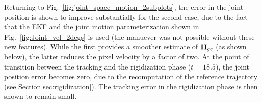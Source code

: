 
Returning to Fig.~\ref{fig:joint_space_motion_2subplots}, the error in the joint position is shown to improve substantially for the second case, due to the fact that the EKF and the joint motion parameterization shown in Fig.~\ref{fig:Joint_vel_2degs} is used (the manuever was not possible without these new features). While the first provides a smoother estimate of $\boldsymbol {\mathrm{H}}{}_{ge}$ (as shown below), the latter reduces the pixel velocity by a factor of two. At the point of transition between the tracking and the rigidization phase ($t=18.5$), the joint position error becomes zero, due to the recomputation of the reference trajectory (see Section\ref{sec:rigidization}). The tracking error in the rigidization phase is then shown to remain small.

